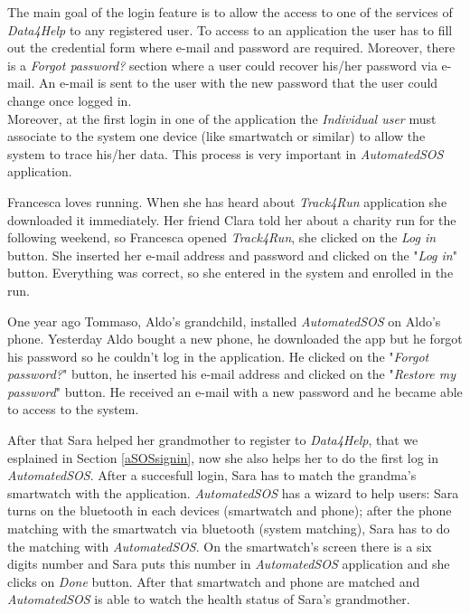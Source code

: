The main goal of the login feature is to allow the access to one of the services of \textit{Data4Help} to any registered user. To access to an application the user has to fill out the credential form where e-mail and password are required. Moreover, there is a \textit{Forgot password?} section where a user could recover his/her password via e-mail. An e-mail is sent to the user with the new password that the user could change once logged in.\\
Moreover, at the first login in one of the application the \textit{Individual user} must associate to the system one device (like smartwatch or similar) to allow the system to trace his/her data. This process is very important in \textit{AutomatedSOS} application.

Francesca loves running. When she has heard about \textit{Track4Run} application she downloaded it immediately. Her friend Clara told her about a charity run for the following weekend, so Francesca opened \textit{Track4Run}, she clicked on the \textit{Log in} button. She inserted her e-mail address and password and clicked on the "\textit{Log in}" button. Everything was correct, so she entered in the system and enrolled in the run.

One year ago Tommaso, Aldo's grandchild, installed \textit{AutomatedSOS} on Aldo’s phone. Yesterday Aldo bought a new phone, he downloaded the app but he forgot his password so he couldn’t log in the application. He clicked on the "\textit{Forgot password?}" button, he inserted his e-mail address and clicked on the  "\textit{Restore my password}" button. He received an e-mail with a new password and he became able to access to the system.

After that Sara helped her grandmother to register to \textit{Data4Help}, that we esplained in Section \ref{aSOSsignin}, now she also helps her to do the first log in \textit{AutomatedSOS}. After a succesfull login, Sara has to match the grandma's smartwatch with the application. \textit{AutomatedSOS} has a wizard to help users: Sara turns on the bluetooth in each devices (smartwatch and phone); after the phone matching with the smartwatch via bluetooth (system matching), Sara has to do the matching with \textit{AutomatedSOS}. On the smartwatch's screen there is a six digits number and Sara puts this number in \textit{AutomatedSOS} application and she clicks on \textit{Done} button. After that smartwatch and phone are matched and \textit{AutomatedSOS} is able to watch the health status of Sara's grandmother.

